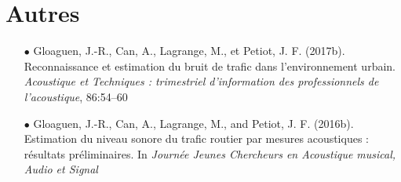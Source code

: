 \section*{Autres}
\begin{itemize}
\item[$\bullet$] Gloaguen, J.-R., Can, A., Lagrange, M., et Petiot, J. F. (2017b). Reconnaissance et estimation du bruit de trafic dans l’environnement urbain. \textit{Acoustique et Techniques : trimestriel d’information des professionnels de l’acoustique}, 86:54–60
\item[$\bullet$] Gloaguen, J.-R., Can, A., Lagrange, M., and Petiot, J. F. (2016b). Estimation du niveau sonore du trafic routier par mesures acoustiques : résultats préliminaires. In \textit{Journée Jeunes Chercheurs en Acoustique musical, Audio et Signal}
\end{itemize}